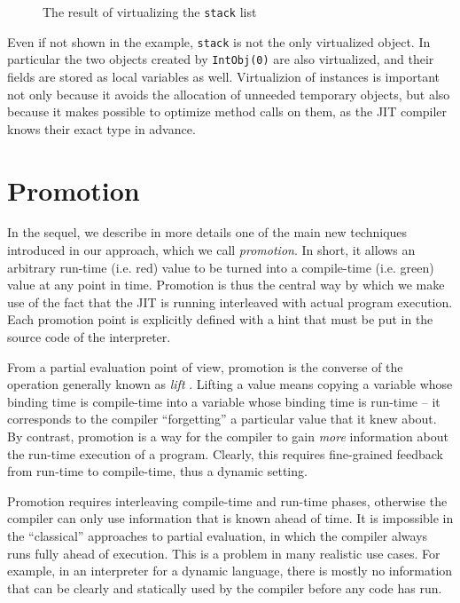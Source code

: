 \begin{figure}[h]
\begin{center}

\caption{The result of virtualizing the \lstinline{stack} list}
\label{fig:tlc-folded-virtualized}
\end{center}
\end{figure}

Even if not shown in the example, \lstinline{stack} is not the only
virtualized object.  In particular the two objects created by
\lstinline{IntObj(0)} are also virtualized, and their fields are stored as
local variables as well.  Virtualizion of instances is important not only
because it avoids the allocation of unneeded temporary objects, but also
because it makes possible to optimize method calls on them, as the JIT
compiler knows their exact type in advance.


\section{Promotion}
\label{sec:promotion}

In the sequel, we describe in more details one of the main new
techniques introduced in our approach, which we call \emph{promotion}.  In
short, it allows an arbitrary run-time (i.e. red) value to be turned into a
compile-time (i.e. green) value at any point in time.  Promotion is thus the central way by
which we make use of the fact that the JIT is running interleaved with actual
program execution. Each promotion point is explicitly defined with a hint that
must be put in the source code of the interpreter.

From a partial evaluation point of view, promotion is the converse of
the operation generally known as \emph{lift} \cite{XXX}.  Lifting a value means
copying a variable whose binding time is compile-time into a variable
whose binding time is run-time – it corresponds to the compiler
``forgetting'' a particular value that it knew about.  By contrast,
promotion is a way for the compiler to gain \emph{more} information about
the run-time execution of a program. Clearly, this requires
fine-grained feedback from run-time to compile-time, thus a
dynamic setting.

Promotion requires interleaving compile-time and run-time phases,
otherwise the compiler can only use information that is known ahead of
time. It is impossible in the ``classical'' approaches to partial
evaluation, in which the compiler always runs fully ahead of execution.
This is a problem in many realistic use cases.  For example, in an
interpreter for a dynamic language, there is mostly no information
that can be clearly and statically used by the compiler before any
code has run.

